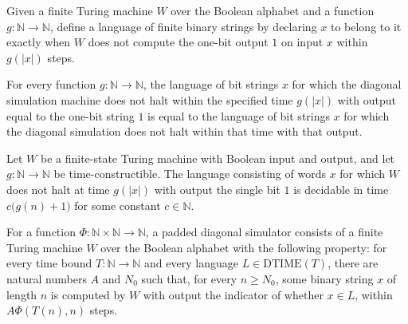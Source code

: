 \begin{definition}
\label{Complexity.TimeHierarchy.diagLangOf}
\leanok
{}
Given a finite Turing machine $W$ over the Boolean alphabet and a function $g :
\mathbb{N} \to \mathbb{N}$, define a language of finite binary strings by declaring $x$
to belong to it exactly when $W$ does not compute the one-bit output $1$ on input $x$
within $g(|x|)$ steps.
\end{definition}

\begin{theorem}
\label{Complexity.TimeHierarchy.diagLang_eq_diagLangOf}
\leanok
{}
For every function $g:\mathbb{N}\to\mathbb{N}$, the language of bit strings $x$ for
which the diagonal simulation machine does not halt within the specified time $g(|x|)$
with output equal to the one-bit string $1$ is equal to the language of bit strings $x$
for which the diagonal simulation does not halt within that time with that output.
\end{theorem}

\begin{theorem}
\label{Complexity.TimeHierarchy.diagLangOf_mem_DTIME}
\leanok
{}
Let $W$ be a finite-state Turing machine with Boolean input and output, and let
$g:\mathbb{N}\to\mathbb{N}$ be time-constructible. The language consisting of words $x$
for which $W$ does not halt at time $g(|x|)$ with output the single bit $1$ is decidable
in time $c\bigl(g(n)+1\bigr)$ for some constant $c\in\mathbb{N}$.
\end{theorem}

\begin{definition}
\label{Complexity.TimeHierarchy.DiagSimulator}
\leanok
{}
For a function $\Phi : \mathbb{N} \times \mathbb{N} \to \mathbb{N}$, a padded diagonal
simulator consists of a finite Turing machine $W$ over the Boolean alphabet with the
following property: for every time bound $T : \mathbb{N} \to \mathbb{N}$ and every
language $L \in \mathrm{DTIME}(T)$, there are natural numbers $A$ and $N_0$ such that,
for every $n \ge N_0$, some binary string $x$ of length $n$ is computed by $W$ with
output the indicator of whether $x \in L$, within $A\Phi(T(n),n)$ steps.
\end{definition}

